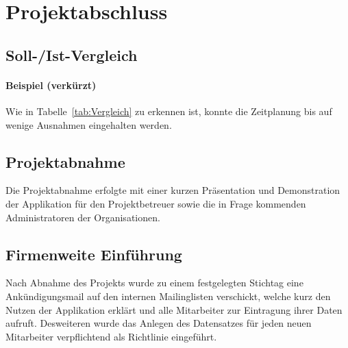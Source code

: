 \section{Projektabschluss}
\label{sec:Projektabschluss}

\subsection{Soll-/Ist-Vergleich}
\label{sec:SollIstVergleich}

\paragraph{Beispiel (verkürzt)}
Wie in Tabelle~\ref{tab:Vergleich} zu erkennen ist, konnte die Zeitplanung bis auf wenige Ausnahmen eingehalten werden.

\subsection{Projektabnahme}
\label{sec:Projektabnahme}
Die Projektabnahme erfolgte mit einer kurzen Präsentation und Demonstration der Applikation für den
Projektbetreuer sowie die in Frage kommenden Administratoren der Organisationen.

\subsection{Firmenweite Einführung}
\label{Firmenweite Einführung}
Nach Abnahme des Projekts wurde zu einem festgelegten Stichtag eine Ankündigungsmail auf den
internen Mailinglisten verschickt, welche kurz den Nutzen der Applikation erklärt und alle
Mitarbeiter zur Eintragung ihrer Daten aufruft. Desweiteren wurde das Anlegen des Datensatzes für
jeden neuen Mitarbeiter verpflichtend als Richtlinie eingeführt.
